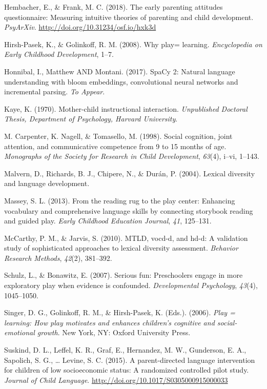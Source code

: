 \documentclass[10pt, letterpaper]{article}
\begin{document}
\hypertarget{ref-Hembacher2018}{}
Hembacher, E., \& Frank, M. C. (2018). The early parenting attitudes
questionnaire: Measuring intuitive theories of parenting and child
development. \emph{PsyArXiv}. \url{http://doi.org/10.31234/osf.io/hxk3d}

\hypertarget{ref-Hirsh2008}{}
Hirsh-Pasek, K., \& Golinkoff, R. M. (2008). Why play= learning.
\emph{Encyclopedia on Early Childhood Development}, 1--7.

\hypertarget{ref-spacy2}{}
Honnibal, I., Matthew AND Montani. (2017). SpaCy 2: Natural language
understanding with bloom embeddings, convolutional neural networks and
incremental parsing. \emph{To Appear}.

\hypertarget{ref-Kaye1970}{}
Kaye, K. (1970). Mother-child instructional interaction.
\emph{Unpublished Doctoral Thesis, Department of Psychology, Harvard
University}.

\hypertarget{ref-Carpenter1998}{}
M. Carpenter, K. Nagell, \& Tomasello, M. (1998). Social cognition,
joint attention, and communicative competence from 9 to 15 months of
age. \emph{Monographs of the Society for Research in Child Development},
\emph{63}(4), i--vi, 1--143.

\hypertarget{ref-Malvern2004}{}
Malvern, D., Richards, B. J., Chipere, N., \& Durán, P. (2004). Lexical
diversity and language development.

\hypertarget{ref-Massey2013}{}
Massey, S. L. (2013). From the reading rug to the play center: Enhancing
vocabulary and comprehensive language skills by connecting storybook
reading and guided play. \emph{Early Childhood Education Journal},
\emph{41}, 125--131.

\hypertarget{ref-McCarthy2010}{}
McCarthy, P. M., \& Jarvis, S. (2010). MTLD, vocd-d, and hd-d: A
validation study of sophisticated approaches to lexical diversity
assessment. \emph{Behavior Research Methods}, \emph{42}(2), 381--392.

\hypertarget{ref-Schulz2007}{}
Schulz, L., \& Bonawitz, E. (2007). Serious fun: Preschoolers engage in
more exploratory play when evidence is confounded. \emph{Developmental
Psychology}, \emph{43}(4), 1045--1050.

\hypertarget{ref-Singer2006}{}
Singer, D. G., Golinkoff, R. M., \& Hirsh-Pasek, K. (Eds.). (2006).
\emph{Play = learning: How play motivates and enhances children's
cognitive and social-emotional growth}. New York, NY: Oxford University
Press.

\hypertarget{ref-Suskind2015}{}
Suskind, D. L., Leffel, K. R., Graf, E., Hernandez, M. W., Gunderson, E.
A., Sapolich, S. G., \ldots{} Levine, S. C. (2015). A parent-directed
language intervention for children of low socioeconomic status: A
randomized controlled pilot study. \emph{Journal of Child Language}.
\url{http://doi.org/10.1017/S0305000915000033}
\end{document}
